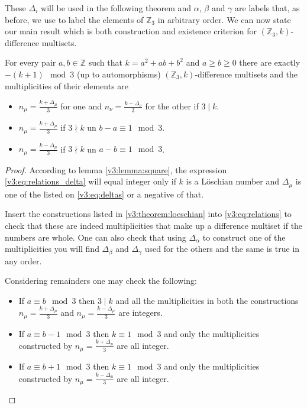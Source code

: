     These $\Delta_i$ will be used in the following theorem and $\alpha$, $\beta$ and $\gamma$ are labels that, as before, we use to label the elements of $\mathbb Z_3$ in arbitrary order. We can now state our main result which is both construction and existence criterion for $(\mathbb Z_3,k)$-difference multisets.

    \begin{theorem}
        \label{v3:theorem:loeschian}
        For every pair $a,b \in \mathbb Z$ such that $k=a^2+ab+b^2$ and $a \geq b \geq 0$ there are exactly $-(k+1) \mod 3$ (up to automorphisms) $(\mathbb Z_3,k)$-difference multisets and the multiplicities of their elements are
        
        \begin{itemize}
            \item $n_\mu=\frac{k+\Delta_\mu}{3}$ for one and $n_\nu=\frac{k-\Delta_\nu}{3}$ for the other if $3 \mid k$.
            \item $n_\mu=\frac{k+\Delta_\mu}{3}$ if $3 \nmid k$ un $b-a \equiv 1 \mod 3$.
            \item $n_\mu=\frac{k-\Delta_\mu}{3}$ if $3 \nmid k$ un $a-b \equiv 1 \mod 3$.
        \end{itemize}
    \end{theorem}

    \begin{proof}
        According to lemma \ref{v3:lemma:square}, the expression \eqref{v3:eq:relations_delta} will equal integer only if $k$ is a Löschian number and $\Delta_\mu$ is one of the listed on \eqref{v3:eq:deltas} or a negative of that.
        
        Insert the constructions listed in \eqref{v3:theorem:loeschian} into \eqref{v3:eq:relations} to check that these are indeed multiplicities that make up a difference multiset if the numbers are whole. One can also check that using $\Delta_\alpha$ to construct one of the multiplicities you will find $\Delta_\beta$ and $\Delta_\gamma$ used for the others and the same is true in any order.
        
        Considering remainders one may check the following:
        \begin{itemize}
            \item If $a \equiv b \mod 3$ then $3 \mid k$ and all the multiplicities in both the constructions $n_\mu=\frac{k+\Delta_\mu}{3}$ and $n_\mu=\frac{k-\Delta_\mu}{3}$ are integers.
            \item If $a \equiv b-1 \mod 3$ then $k \equiv 1 \mod 3$ and only the multiplicities constructed by $n_\mu=\frac{k+\Delta_\mu}{3}$ are all integer.
            \item If $a \equiv b+1 \mod 3$ then $k \equiv 1 \mod 3$ and only the multiplicities constructed by $n_\mu=\frac{k-\Delta_\mu}{3}$ are all integer.
        \end{itemize}
    \end{proof}

